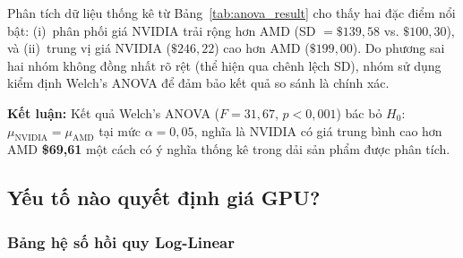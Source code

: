 Phân tích dữ liệu thống kê từ Bảng~\ref{tab:anova_result} cho thấy hai đặc điểm nổi bật: (i)~phân phối giá NVIDIA trải rộng hơn AMD (SD $= \$139{,}58$ vs. $\$100{,}30$), và (ii)~trung vị giá NVIDIA ($\$246{,}22$) cao hơn AMD ($\$199{,}00$). Do phương sai hai nhóm không đồng nhất rõ rệt (thể hiện qua chênh lệch SD), nhóm sử dụng kiểm định Welch's ANOVA để đảm bảo kết quả so sánh là chính xác.

\textbf{Kết luận:} Kết quả Welch's ANOVA ($F = 31{,}67$, $p < 0{,}001$) bác bỏ $H_0$: $\mu_{\mathrm{NVIDIA}} = \mu_{\mathrm{AMD}}$ tại mức $\alpha = 0{,}05$, nghĩa là NVIDIA có giá trung bình cao hơn AMD \textbf{\$69,61} một cách có ý nghĩa thống kê trong dải sản phẩm được phân tích.

\subsection{Yếu tố nào quyết định giá GPU?}

\subsubsection{Bảng hệ số hồi quy Log-Linear}

